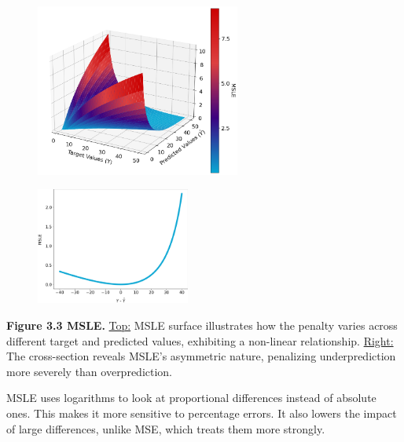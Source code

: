 \clearpage

\thispagestyle{customstyle}

\begin{figure}[ht!]
    \centering
    \includegraphics[width=0.6\textwidth]{figures/MSLE_3d_surface.png}
    
\end{figure}

\begin{figure}
    \centering
    \vspace{-10pt} 
    \includegraphics[width=0.45\textwidth]{figures/MSLE_cross_section.png} %
    \vspace{-10pt} %
\end{figure}

\textbf{Figure 3.3 MSLE.} \underline{Top:} MSLE surface illustrates how the penalty varies across different target and predicted values, exhibiting a non-linear relationship.
\underline{Right:}  The cross-section reveals MSLE's asymmetric nature, penalizing underprediction more severely than overprediction. 



{MSLE uses logarithms to look at proportional differences instead of absolute ones. 
This makes it more sensitive to percentage errors. It also lowers the impact of large differences, unlike MSE, which treats them more strongly.}

